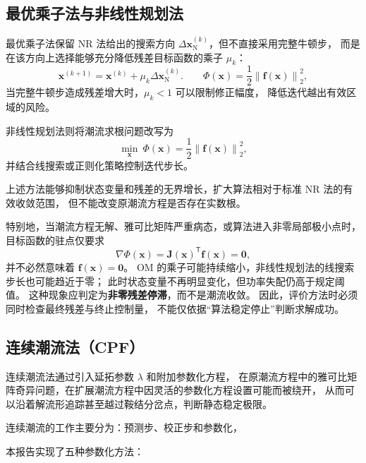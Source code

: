 \subsection{最优乘子法与非线性规划法}

最优乘子法保留 NR 法给出的搜索方向
$\Delta\bm{x}_{\mathrm{N}}^{(k)}$，但不直接采用完整牛顿步，
而是在该方向上选择能够充分降低残差目标函数的乘子 $\mu_k$：
\begin{equation}
\bm{x}^{(k+1)}
=\bm{x}^{(k)}+\mu_k\Delta\bm{x}_{\mathrm{N}}^{(k)}.
\qquad
\Phi(\bm{x})=\frac{1}{2}\left\|\bm{f}(\bm{x})\right\|_2^2,
\label{eq:om-iteration}
\end{equation}
当完整牛顿步造成残差增大时，$\mu_k<1$ 可以限制修正幅度，
降低迭代越出有效区域的风险。

非线性规划法则将潮流求根问题改写为
\begin{equation}
\min_{\bm{x}}\ \Phi(\bm{x})
=\frac{1}{2}\left\|\bm{f}(\bm{x})\right\|_2^2,
\label{eq:nlp-objective}
\end{equation}
并结合线搜索或正则化策略控制迭代步长。

上述方法能够抑制状态变量和残差的无界增长，扩大算法相对于标准 NR 法的有效收敛范围，
但不能改变原潮流方程是否存在实数根。

\pagebreak[3]
特别地，当潮流方程无解、雅可比矩阵严重病态，或算法进入非零局部极小点时，目标函数的驻点仅要求
\begin{equation}
\nabla\Phi(\bm{x})
=\bm{J}(\bm{x})^{\mathsf T}\bm{f}(\bm{x})=\bm{0},
\label{eq:least-squares-stationary}
\end{equation}
并不必然意味着 $\bm{f}(\bm{x})=\bm{0}$。
OM 的乘子可能持续缩小，非线性规划法的线搜索步长也可能趋近于零；
此时状态变量不再明显变化，但功率失配仍高于规定阈值。
这种现象应判定为\textbf{非零残差停滞}，而不是潮流收敛。
因此，评价方法时必须同时检查最终残差与终止控制量，
不能仅依据“算法稳定停止”判断求解成功。

\subsection{连续潮流法（CPF）}

连续潮流法\cite{ajjarapu1992}通过引入延拓参数 $\lambda$ 和附加参数化方程，
在原潮流方程中的雅可比矩阵奇异问题，在扩展潮流方程中因灵活的参数化方程设置可能而被绕开，
从而可以沿着解流形追踪甚至越过鞍结分岔点，判断静态稳定极限。

连续潮流的工作主要分为：预测步、校正步和参数化，

本报告实现了五种参数化方法：

